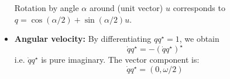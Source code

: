 \documentclass[a4paper]{article}
\begin{document}
\begin{itemize}
Rotation by angle $\alpha$ around (unit vector) $u$ corresponds to $q = \cos(\alpha/2) + \sin(\alpha/2) u$.

\item \textbf{Angular velocity: } By differentiating $q q^\star = 1$, we obtain
\begin{displaymath}
\dot{q} q^\star = -(\dot{q} q^\star)^\star
\end{displaymath}
i.e. $\dot{q} q^\star$ is pure imaginary. The vector component is:
\begin{displaymath}
\dot{q} q^\star = (0, \omega/2)
\end{displaymath}
\end{itemize}
\end{document}
